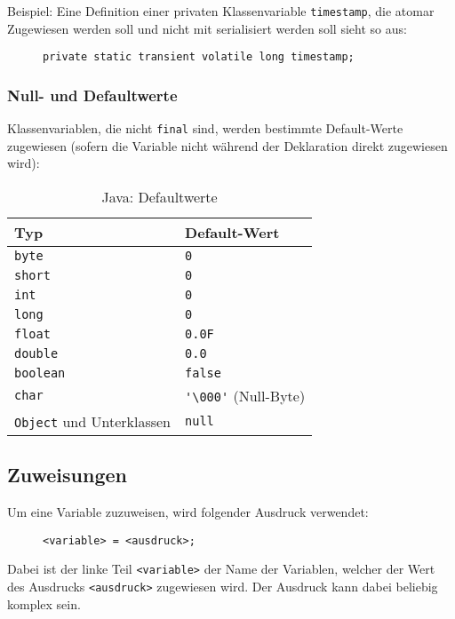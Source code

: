 		Beispiel: Eine Definition einer privaten Klassenvariable \texttt{timestamp}, die atomar Zugewiesen werden soll und nicht mit serialisiert werden soll sieht so aus:
		\begin{figure}[H]
			\centering
			\lstinline|private static transient volatile long timestamp;|
		\end{figure}
	
	
	\subsubsection{Null- und Defaultwerte}
		Klassenvariablen, die nicht \lstinline|final| sind, werden bestimmte Default-Werte zugewiesen (sofern die Variable nicht während der Deklaration direkt zugewiesen wird):
		\begin{table}[H]
			\centering
			\begin{tabular}{l | l}
				\textbf{Typ} & \textbf{Default-Wert} \\ \hline
				\lstinline|byte| & \lstinline|0| \\
				\lstinline|short| & \lstinline|0| \\
				\lstinline|int| & \lstinline|0| \\
				\lstinline|long| & \lstinline|0| \\
				\lstinline|float| & \lstinline|0.0F| \\
				\lstinline|double| & \lstinline|0.0| \\
				\lstinline|boolean| & \lstinline|false| \\
				\lstinline|char| & \lstinline|'\000'| (Null-Byte) \\
				\lstinline|Object| und Unterklassen & \lstinline|null| \\
			\end{tabular}
			\caption{Java: Defaultwerte}
		\end{table}

\subsection{Zuweisungen}
	
	Um eine Variable zuzuweisen, wird folgender Ausdruck verwendet:
	\begin{figure}[H]
		\centering
		\lstinline|<variable> = <ausdruck>;|
	\end{figure}
	Dabei ist der linke Teil \texttt{<variable>} der Name der Variablen, welcher der Wert des Ausdrucks \texttt{<ausdruck>} zugewiesen wird. Der Ausdruck kann dabei beliebig komplex sein.
	
